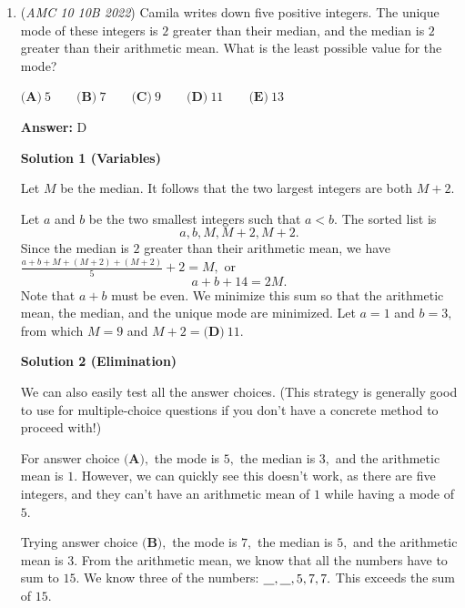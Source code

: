 \begin{enumerate}
\textbf{Solution 8 (Taylor Series)}

We calculate the Taylor series error to be $\frac{1}{2023!}$ and this error happens $2023$ times so it is $\frac{2023}{2023!}$ which is $\frac{1}{2022!}$




\textbf{Solution 9 (Really Really Fast and Cheesy)}

Because this is obviously a telescoping series, we can guess small values and use engineer's induction. Note that $\frac{1}{2!} = 1-\frac{1}{2!}$, so we guess $a=1$ and $b=2022$. We get $1+2022=\boxed{\textbf{(D) }2023}.$



	\item (\textit{AMC 10 10B 2022}) Camila writes down five positive integers. The unique mode of these integers is $2$ greater than their median, and the median is $2$ greater than their arithmetic mean. What is the least possible value for the mode?


 $\textbf{(A)}\ 5 \qquad\textbf{(B)}\ 7 \qquad\textbf{(C)}\ 9 \qquad\textbf{(D)}\ 11 \qquad\textbf{(E)}\ 13$

 \textbf{Answer: }D



\textbf{Solution 1 (Variables)}

Let $M$ be the median. It follows that the two largest integers are both $M+2.$

 Let $a$ and $b$ be the two smallest integers such that $a<b.$ The sorted list is 
 \[a,b,M,M+2,M+2.\]Since the median is $2$ greater than their arithmetic mean, we have $\frac{a+b+M+(M+2)+(M+2)}{5}+2=M,$ or 
 \[a+b+14=2M.\]Note that $a+b$ must be even. We minimize this sum so that the arithmetic mean, the median, and the unique mode are minimized. Let $a=1$ and $b=3,$ from which $M=9$ and $M+2=\boxed{\textbf{(D)}\ 11}.$




\textbf{Solution 2 (Elimination)}

We can also easily test all the answer choices. (This strategy is generally good to use for multiple-choice questions if you don't have a concrete method to proceed with!)

 For answer choice $\textbf{(A)},$ the mode is $5,$ the median is $3,$ and the arithmetic mean is $1.$ However, we can quickly see this doesn't work, as there are five integers, and they can't have an arithmetic mean of $1$ while having a mode of $5.$ 

 Trying answer choice $\textbf{(B)},$ the mode is $7,$ the median is $5,$ and the arithmetic mean is $3.$ From the arithmetic mean, we know that all the numbers have to sum to $15.$ We know three of the numbers: $\underline{\hspace{3mm}},\underline{\hspace{3mm}},5,7,7.$ This exceeds the sum of $15.$


\end{enumerate}
